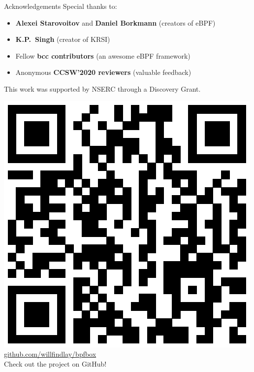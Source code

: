\documentclass[12pt, dvipsnames, aspectratio=169]{beamer}
\begin{document}
\begin{frame}[c]{Acknowledgements}
Special thanks to:
\begin{itemize}
    \item \textbf{Alexei Starovoitov} and \textbf{Daniel Borkmann} (creators of eBPF)
    \item \textbf{K.P.~Singh} (creator of KRSI)
    \item Fellow \textbf{bcc contributors} (an awesome eBPF framework)
    \item Anonymous \textbf{CCSW'2020 reviewers} (valuable feedback)
\end{itemize}
\vfill
This work was supported by NSERC through a Discovery Grant.
\begin{center}
    \includegraphics[height=0.4\textheight]{figs/bpfbox-qrcode.eps}\\
    \href{https://github.com/willfindlay/bpfbox}{\ttfamily github.com/willfindlay/bpfbox}\\
    Check out the project on GitHub!
\end{center}
\end{frame}
\end{document}
